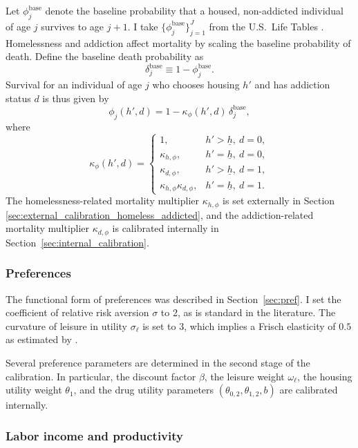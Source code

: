 \documentclass[parskip=full]{article}
\theoremstyle{plain}
\theoremstyle{definition}
\theoremstyle{remark}
\begin{document}
Let $\phi_j^{\text{base}}$ denote the baseline probability that a housed, non-addicted individual of age $j$ survives to age $j+1$. I take $\{\phi_j^{\text{base}}\}_{j=1}^J$ from the U.S.\ Life Tables \citep{arias-2014}. Homelessness and addiction affect mortality by scaling the baseline probability of death. Define the baseline death probability as
\[\delta_j^{\text{base}} \equiv 1-\phi_j^{\text{base}}.\]
Survival for an individual of age $j$ who chooses housing $h'$ and has addiction status $d$ is thus given by
\begin{equation*}
\label{eq:survival_wedge}
\phi_j(h',d)=1-\kappa_{\phi}(h',d)\,\delta_j^{\text{base}},
\end{equation*}
where
\begin{equation*}
\kappa_{\phi}(h',d)=
\begin{cases}
1, & h'>\underline h,\ d=0,\\
\kappa_{h,\phi}, & h'=\underline h,\ d=0,\\
\kappa_{d,\phi}, & h'>\underline h,\ d=1,\\
\kappa_{h,\phi}\kappa_{d,\phi}, & h'=\underline h,\ d=1.
\end{cases}
\end{equation*}
The homelessness-related mortality multiplier $\kappa_{h,\phi}$ is set externally in Section \ref{sec:external_calibration_homeless_addicted}, and the addiction-related mortality multiplier $\kappa_{d,\phi}$ is calibrated internally in Section~\ref{sec:internal_calibration}.

\subsubsection{Preferences}

The functional form of preferences was described in Section~\ref{sec:pref}. I set the coefficient of relative risk aversion $\sigma$ to 2, as is standard in the literature. The curvature of leisure in utility $\sigma_\ell$ is set to $3$, which implies a Frisch elasticity of $0.5$ as estimated by \citet{Chetty2012Frisch}.

Several preference parameters are determined in the second stage of the calibration. In particular, the discount factor $\beta$, the leisure weight $\omega_\ell$, the housing utility weight $\theta_1$, and the drug utility parameters $(\theta_{0,2},\theta_{1,2},b)$ are calibrated internally.

\subsubsection{Labor income and productivity}
\end{document}
